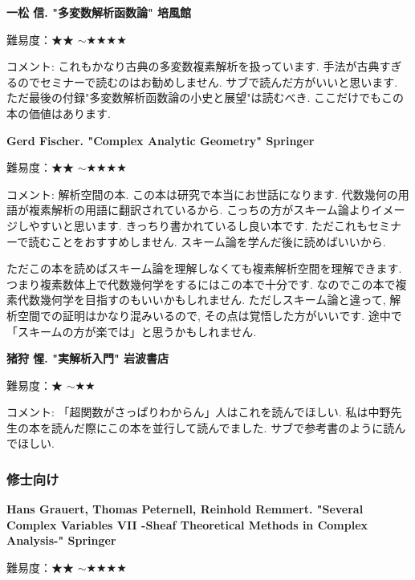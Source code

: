 \textbf{一松 信. "多変数解析函数論" 培風館}  　\vspace{-6pt} 

難易度：★★ $\sim$★★★★ 　\vspace{-6pt} 

コメント: これもかなり古典の多変数複素解析を扱っています. 手法が古典すぎるのでセミナーで読むのはお勧めしません. サブで読んだ方がいいと思います.
ただ最後の付録"多変数解析函数論の小史と展望"は読むべき. ここだけでもこの本の価値はあります. 
\vspace{8pt}


\textbf{Gerd Fischer. "Complex Analytic Geometry" Springer}  　\vspace{-6pt} 

難易度：★★ $\sim$★★★★ 　\vspace{-6pt} 

コメント: 解析空間の本. この本は研究で本当にお世話になります. 代数幾何の用語が複素解析の用語に翻訳されているから. こっちの方がスキーム論よりイメージしやすいと思います. きっちり書かれているし良い本です. 
ただこれもセミナーで読むことをおすすめしません. スキーム論を学んだ後に読めばいいから. 
 
ただこの本を読めばスキーム論を理解しなくても複素解析空間を理解できます. つまり複素数体上で代数幾何学をするにはこの本で十分です. なのでこの本で複素代数幾何学を目指すのもいいかもしれません. ただしスキーム論と違って, 解析空間での証明はかなり混みいるので, その点は覚悟した方がいいです. 途中で「スキームの方が楽では」と思うかもしれません. 
\vspace{8pt}


\textbf{猪狩 惺. "実解析入門" 岩波書店}  　\vspace{-6pt} 

難易度：★ $\sim$★★ 　\vspace{-6pt} 

コメント: 「超関数がさっぱりわからん」人はこれを読んでほしい. 
私は中野先生の本を読んだ際にこの本を並行して読んでました. 
サブで参考書のように読んでほしい. 

\subsubsection{修士向け}

\textbf{Hans Grauert, Thomas Peternell, Reinhold Remmert. "Several Complex Variables VII -Sheaf Theoretical Methods in Complex Analysis-" Springer}  　\vspace{-6pt} 

難易度：★★ $\sim$★★★★ 　\vspace{-6pt} 

